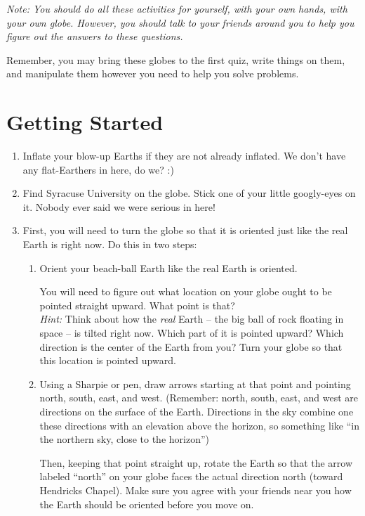 \documentclass[12pt]{article}
\begin{document}
\Large
\centerline{}

\normalsize

{\it Note: You should do all these activities for yourself, with your own hands, with your own globe. However, you should 
talk to your friends around you to help you figure out the answers to these questions. 

Remember, you may bring 
these globes to the first quiz, write things on them, and manipulate them however you need to help you solve problems.}


\section{Getting Started}
\begin{enumerate}

\item Inflate your blow-up Earths if they are not already inflated. We don't have any flat-Earthers in here, do we? :)

\item Find Syracuse University on the globe. Stick one of your little googly-eyes on it. Nobody ever said we were serious in here!

\item First, you will need to turn the globe so that it is oriented just like the real Earth is right now. Do this in two steps:

\begin{enumerate}

\item Orient your beach-ball Earth like the real Earth is oriented. 

You will need to figure out what location on your globe ought to be pointed straight upward. What point is that? 
\\

{\it Hint:} Think about how the {\it real} Earth -- the big ball of rock floating in space -- is tilted right now. Which part of it is pointed upward? Which direction is the center of the Earth from you? Turn your globe
so that this location is pointed upward. 

\vspace{1in}

\item {Using a Sharpie or pen, draw arrows starting at that point and pointing north, south, east, and west. (Remember: north, south, east, and west are directions on the surface of the Earth. Directions in the sky combine one these directions with an elevation above the horizon, so something like ``in the northern sky, close to the horizon'')

\medskip

Then, keeping that point straight up, rotate the Earth so that the arrow labeled ``north'' on your globe faces the actual direction north (toward Hendricks Chapel). Make sure you agree with your friends near you how the Earth should be oriented before you move on.
}

\end{enumerate}
\end{enumerate}
\end{document}
